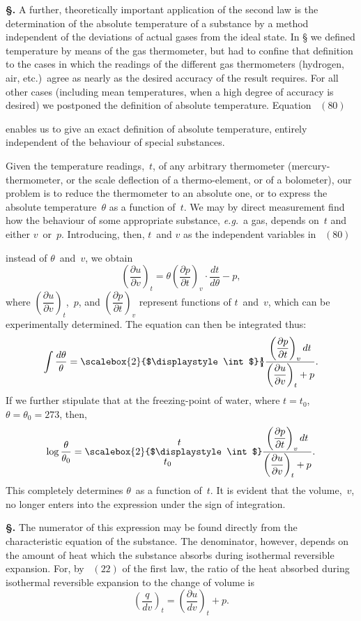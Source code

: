\documentclass[12pt]{book}[2005/09/16]
\newcommand{\Section}[1]{
  \medskip\par\textbf{§\;#1}
  \label{section:#1}
}
\newcommand{\SecRef}[2][§\;]{\hyperref[section:#2.]{{\upshape #1#2}}}
\newcommand{\Eq}[1]{%
  \hyperref[eqn:#1]{\ensuremath{#1}}%
}
\newcommand{\PageSep}[1]{\ignorespaces}
\newcommand{\eg}{\emph{e.g.}}
\newcommand{\dd}{\partial}
\newcommand{\Bigint}[1][2]{%
  \scalebox{#1}{$\displaystyle\int$}{\kern-4pt}%
}
\newcommand{\EmRule}{\rule{12pt}{0pt}}
\newcommand{\Bigintlimits}[3][2]{%
  \mathop{\scalebox{#1}{$\displaystyle\int$}}\limits_{\mbox{$#2$\EmRule}}^{\mbox{\EmRule$#3$}}\kern-2pt%
}
\begin{document}
\Section{160.} A further, theoretically important application of
the second law is the determination of the absolute temperature
of a substance by a method independent of the
\PageSep{127}
%
deviations of actual gases from the ideal state. In \SecRef{4} we
defined temperature by means of the gas thermometer, but
had to confine that definition to the cases in which the
readings of the different gas thermometers (hydrogen, air,
etc.)\ agree as nearly as the desired accuracy of the result
requires. For all other cases (including mean temperatures,
when a high degree of accuracy is desired) we postponed
the definition of absolute temperature. Equation~\Eq{(80)}
%
enables us to give an exact definition of absolute temperature,
entirely independent of the behaviour of special
substances.

Given the temperature readings,~$t$, of any arbitrary
thermometer (mercury-thermometer, or the scale deflection
of a thermo-element, or of a bolometer), our problem is to
reduce the thermometer to an absolute one, or to express
the absolute temperature~$\theta$ as a function of~$t$. We may by
direct measurement find how the behaviour of some appropriate
substance, \eg\ a gas, depends on~$t$ and either $v$~or~$p$.
Introducing, then, $t$~and $v$ as the independent variables in~\Eq{(80)}
instead of $\theta$~and~$v$, we obtain
\[
\left(\frac{\dd u}{\dd v}\right)_{t}
  = \theta \left(\frac{\dd p}{\dd t}\right)_{v} · \frac{dt}{d\theta} - p,
\]
where $\left(\dfrac{\dd u}{\dd v}\right)_{t}$,~$p$, and $\left(\dfrac{\dd p}{\dd t}\right)_{v}$ represent functions of $t$~and~$v$,
which can be experimentally determined. The equation
can then be integrated thus:
\[
\int \frac{d\theta}{\theta}
  = \Bigint \frac{\left(\dfrac{\dd p}{\dd t}\right)_{v} dt}{\left(\dfrac{\dd u}{\dd v}\right)_{t} + p}.
\]
If we further stipulate that at the freezing-point of water,
where $t = t_{0}$, $\theta = \theta_{0} = 273$, then,
\[
\log \frac{\theta}{\theta_{0}}
  = \Bigintlimits{t_{0}}{t} \frac{\left(\dfrac{\dd p}{\dd t}\right)_{v} dt}{\left(\dfrac{\dd u}{\dd v}\right)_{t} + p}.
\]
\PageSep{128}
This completely determines $\theta$~as a function of~$t$. It is
evident that the volume,~$v$, no longer enters into the
expression under the sign of integration.

\Section{161.} The numerator of this expression may be found
directly from the characteristic equation of the substance.
The denominator, however, depends on the amount of heat
which the substance absorbs during isothermal reversible
expansion. For, by~\Eq{(22)} of the first law, the ratio of the
heat absorbed during isothermal reversible expansion to the
change of volume is
\[
\left(\frac{q}{dv}\right)_{t} = \left(\frac{\dd u}{dv}\right)_{t} + p.
\]
\end{document}
